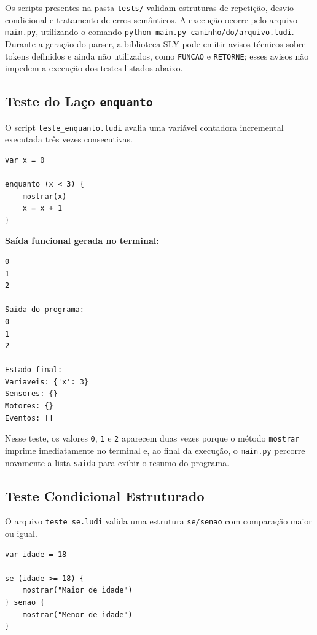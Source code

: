 \documentclass[12pt,a4paper]{article}
\begin{document}
Os scripts presentes na pasta \texttt{tests/} validam estruturas de repetição, desvio condicional e tratamento de erros semânticos. A execução ocorre pelo arquivo \texttt{main.py}, utilizando o comando \texttt{python main.py caminho/do/arquivo.ludi}. Durante a geração do parser, a biblioteca SLY pode emitir avisos técnicos sobre tokens definidos e ainda não utilizados, como \texttt{FUNCAO} e \texttt{RETORNE}; esses avisos não impedem a execução dos testes listados abaixo.

\subsection{Teste do Laço \texttt{enquanto}}

O script \texttt{teste\_enquanto.ludi} avalia uma variável contadora incremental executada três vezes consecutivas.

\begin{lstlisting}[caption={tests/teste\_enquanto.ludi}]
var x = 0

enquanto (x < 3) {
    mostrar(x)
    x = x + 1
}
\end{lstlisting}

\textbf{Saída funcional gerada no terminal:}
\begin{lstlisting}[language={}, numbers=none, frame=single, caption={Saída do console para o laço enquanto}]
0
1
2

Saida do programa:
0
1
2

Estado final:
Variaveis: {'x': 3}
Sensores: {}
Motores: {}
Eventos: []
\end{lstlisting}

Nesse teste, os valores \texttt{0}, \texttt{1} e \texttt{2} aparecem duas vezes porque o método \texttt{mostrar} imprime imediatamente no terminal e, ao final da execução, o \texttt{main.py} percorre novamente a lista \texttt{saida} para exibir o resumo do programa.

\subsection{Teste Condicional Estruturado}

O arquivo \texttt{teste\_se.ludi} valida uma estrutura \texttt{se/senao} com comparação maior ou igual.

\begin{lstlisting}[caption={tests/teste\_se.ludi}]
var idade = 18

se (idade >= 18) {
    mostrar("Maior de idade")
} senao {
    mostrar("Menor de idade")
}
\end{lstlisting}
\end{document}

